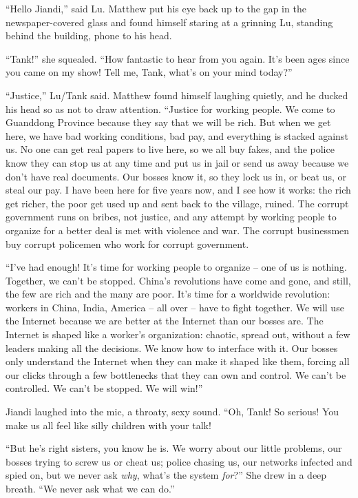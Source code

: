 ``Hello Jiandi,'' said Lu. Matthew put his eye back up to the gap in
the newspaper-covered glass and found himself staring at a grinning
Lu, standing behind the building, phone to his head.

``Tank!'' she squealed. ``How fantastic to hear from you again. It's
been ages since you came on my show! Tell me, Tank, what's on your
mind today?''

``Justice,'' Lu/Tank said. Matthew found himself laughing quietly,
and he ducked his head so as not to draw attention. ``Justice for
working people. We come to Guanddong Province because they say that
we will be rich. But when we get here, we have bad working
conditions, bad pay, and everything is stacked against us. No one
can get real papers to live here, so we all buy fakes, and the
police know they can stop us at any time and put us in jail or send
us away because we don't have real documents. Our bosses know it,
so they lock us in, or beat us, or steal our pay. I have been here
for five years now, and I see how it works: the rich get richer,
the poor get used up and sent back to the village, ruined. The
corrupt government runs on bribes, not justice, and any attempt by
working people to organize for a better deal is met with violence
and war. The corrupt businessmen buy corrupt policemen who work for
corrupt government.

``I've had enough! It's time for working people to organize -- one
of us is nothing. Together, we can't be stopped. China's
revolutions have come and gone, and still, the few are rich and the
many are poor. It's time for a worldwide revolution: workers in
China, India, America -- all over -- have to fight together. We
will use the Internet because we are better at the Internet than
our bosses are. The Internet is shaped like a worker's
organization: chaotic, spread out, without a few leaders making all
the decisions. We know how to interface with it. Our bosses only
understand the Internet when they can make it shaped like them,
forcing all our clicks through a few bottlenecks that they can own
and control. We can't be controlled. We can't be stopped. We will
win!''

Jiandi laughed into the mic, a throaty, sexy sound. ``Oh, Tank! So
serious! You make us all feel like silly children with your talk!

``But he's right sisters, you know he is. We worry about our little
problems, our bosses trying to screw us or cheat us; police chasing
us, our networks infected and spied on, but we never ask
\emph{why}, what's the system \emph{for}?'' She drew in a deep
breath. ``We never ask what we can do.''

